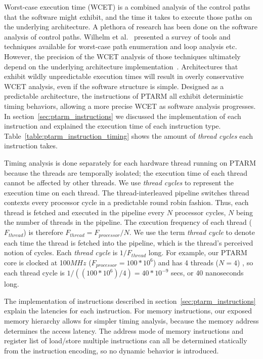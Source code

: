 Worst-case execution time (WCET) is a combined analysis of the control paths that the software might exhibit, and the time it takes to execute those paths on the underlying architecture. 
A plethora of research has been done on the software analysis of control paths. 
Wilhelm et al.~\cite{wilhelm-survey-paper} presented a survey of tools and techniques available for worst-case path enumeration and loop analysis etc.
However, the precision of the WCET analysis of those techniques ultimately depend on the underlying architecture implementation~\cite{Heckmann2003processor}.
Architectures that exhibit wildly unpredictable execution times will result in overly conservative WCET analysis, even if the software structure is simple. 
Designed as a predictable architecture, the instructions of PTARM all exhibit deterministic timing behaviors, allowing a more precise WCET as software analysis progresses. 
In section~\ref{sec:ptarm_instructions} we discussed the implementation of each instruction and explained the execution time of each instruction type.
Table~\ref{table:ptarm_instruction_timing} shows the amount of \emph{thread cycles} each instruction takes. 

Timing analysis is done separately for each hardware thread running on PTARM because the threads are temporally isolated; the execution time of each thread cannot be affected by other threads.  
We use \emph{thread cycles} to represent the execution time on each thread.  
The thread-interleaved pipeline switches thread contexts every processor cycle in a predictable round robin fashion. 
Thus, each thread is fetched and executed in the pipeline every $N$ processor cycles, $N$ being the number of threads in the pipeline.
The execution frequency of each thread ($F_{thread}$) is therefore $F_{thread} = F_{processor}/N$. 
We use the term \emph{thread cycle} to denote each time the thread is fetched into the pipeline, which is the thread's perceived notion of cycles.
Each \emph{thread cycle} is $1/F_{thread}$ long. 
For example, our PTARM core is clocked at 100$MHz$ ($F_{processor} = 100 * 10^6$) and has 4 threads ($N=4$) , so each thread cycle is $1/((100 * 10^6)/4) = 40 * 10^{-9}$ secs, or 40 nanoseconds long.

The implementation of instructions described in section~\ref{sec:ptarm_instructions} explain the latencies for each instruction.
For memory instructions, our exposed memory hierarchy allows for simpler timing analysis, because the memory address determines the access latency.
The address mode of memory instructions and register list of load/store multiple instructions can all be determined statically from the instruction encoding, so no dynamic behavior is introduced.

